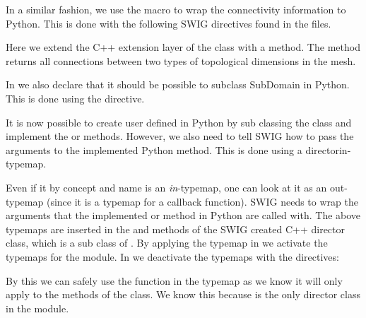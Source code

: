In a similar fashion, we use the  macro to wrap the connectivity information to Python. This is done with the following SWIG directives found in the  files.
Here we extend the C++ extension layer of the  class with a  method. The method returns all connections between two types of topological dimensions in the mesh.

In  we also declare that it should be possible to subclass SubDomain in Python. This is done using the  directive.
\begin{c++}
\end{c++}
It is now possible to create user defined  in Python by sub classing the  class and implement the  or  methods. However, we also need to tell SWIG how to pass the arguments to the implemented Python method. This is done using a directorin-typemap.
Even if it by concept and name is an \textit{in}-typemap, one can look at it as an out-typemap
(since it is a typemap for a callback function). SWIG needs to wrap the arguments that the implemented  or  method in Python are called with. The above typemaps are inserted in the  and  methods of the SWIG created C++ director class, which is a sub class of . By applying the typemap in  we activate the typemaps for the  module. In  we deactivate the typemaps with the directives:
\begin{c++}
\end{c++}
By this we can safely use the function  in the typemap as we know it will only apply to the methods of the  class. We know this because  is the only director class in the  module.

